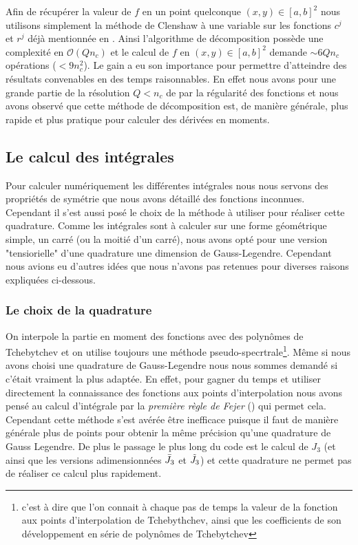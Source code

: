 \documentclass[10.5pt]{article}
\begin{document}
\begin{multicols}{2}
Afin de récupérer la valeur de $f$ en un point quelconque $(x,y) \in [a,b]^2 $ nous utilisons simplement la méthode de Clenshaw à une variable sur les fonctions $c^j$ et $r^j$ déjà mentionnée en . Ainsi l'algorithme de décomposition possède une complexité en $\mathcal{O}(Q n_c)$ et le calcul de $f$ en $(x,y) \in [a,b]^2$ demande $\sim 6Qn_c$ opérations ($< 9n_c^2$). Le gain a eu son importance pour permettre d'atteindre des résultats convenables en des temps raisonnables. En effet nous avons pour une grande partie de la résolution $Q < n_c$ de par la régularité des fonctions et nous avons observé que cette méthode de décomposition est, de manière générale, plus rapide et plus pratique pour calculer des dérivées en moments. \\



\subsection{Le calcul des intégrales} 

Pour calculer numériquement les différentes intégrales nous nous servons des propriétés de symétrie que nous avons détaillé des fonctions inconnues. Cependant il s'est aussi posé le choix de la méthode à utiliser pour réaliser cette quadrature. Comme les intégrales sont à calculer sur une forme géométrique simple, un carré (ou la moitié d'un carré), nous avons opté pour une version "tensiorielle" d'une quadrature une dimension de Gauss-Legendre. Cependant nous avions eu d'autres idées que nous n'avons pas retenues pour diverses raisons expliquées ci-dessous.


\subsubsection{Le choix de la quadrature}

On interpole la partie en moment des fonctions avec des polynômes de Tchebytchev et on utilise toujours une méthode pseudo-specrtrale\footnote{c'est à dire que l'on connait à chaque pas de temps la valeur de la fonction aux points d'interpolation de Tchebythchev, ainsi que les coefficients de son développement en série de polynômes de Tchebytchev}. Même si nous avons choisi une quadrature de Gauss-Legendre nous nous sommes demandé si c'était vraiment la plus adaptée. En effet, pour gagner du temps et utiliser directement la connaissance des fonctions aux points d'interpolation nous avons pensé au calcul d'intégrale par la \emph{première règle de Fejer} \cite{waldvogel2006fast} () qui permet cela.
 Cependant cette méthode s'est avérée être inefficace puisque il faut de manière générale plus de points pour obtenir la même précision qu'une quadrature de Gauss Legendre. De plus le passage le plus long du code est le calcul de $J_3$ (et ainsi que les versions adimensionnées $\bar{J}_3$ et $\tilde{J}_3$) et cette quadrature ne permet pas de réaliser ce calcul plus rapidement.



\end{multicols}
\end{document}
